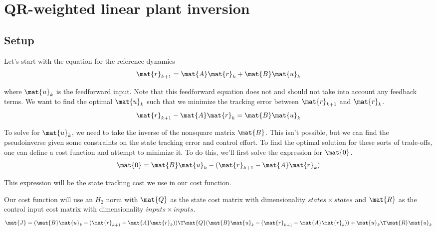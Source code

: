 
\chapter{QR-weighted linear plant inversion}

\section{Setup}

Let's start with the equation for the \gls{reference} dynamics
\begin{equation*}
  \mat{r}_{k+1} = \mat{A}\mat{r}_k + \mat{B}\mat{u}_k
\end{equation*}

where $\mat{u}_k$ is the feedforward input. Note that this feedforward equation
does not and should not take into account any feedback terms. We want to find
the optimal $\mat{u}_k$ such that we minimize the \gls{tracking} error between
$\mat{r}_{k+1}$ and $\mat{r}_k$.
\begin{equation*}
  \mat{r}_{k+1} - \mat{A}\mat{r}_k = \mat{B}\mat{u}_k
\end{equation*}

To solve for $\mat{u}_k$, we need to take the inverse of the nonsquare matrix
$\mat{B}$. This isn't possible, but we can find the pseudoinverse given some
constraints on the \gls{state} \gls{tracking} error and \gls{control effort}. To
find the optimal solution for these sorts of trade-offs, one can define a cost
function and attempt to minimize it. To do this, we'll first solve the
expression for $\mat{0}$.
\begin{equation*}
  \mat{0} = \mat{B}\mat{u}_k - (\mat{r}_{k+1} - \mat{A}\mat{r}_k)
\end{equation*}

This expression will be the \gls{state} \gls{tracking} cost we use in our cost
function.

Our cost function will use an $H_2$ norm with $\mat{Q}$ as the \gls{state} cost
matrix with dimensionality $states \times states$ and $\mat{R}$ as the
\gls{control input} cost matrix with dimensionality $inputs \times inputs$.
\begin{equation*}
  \mat{J} = (\mat{B}\mat{u}_k - (\mat{r}_{k+1} - \mat{A}\mat{r}_k))\T \mat{Q}
    (\mat{B}\mat{u}_k - (\mat{r}_{k+1} - \mat{A}\mat{r}_k)) +
    \mat{u}_k\T\mat{R}\mat{u}_k
\end{equation*}

